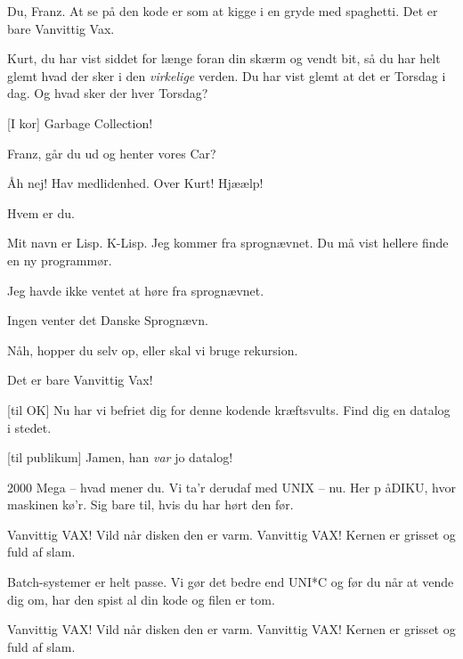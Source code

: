 \documentclass[a4paper,11pt]{article}
\begin{document}
\begin{sketch}

 Du, Franz. At se på den kode er som at kigge i en gryde med
spaghetti. Det er bare Vanvittig Vax.

 Kurt, du har vist siddet for længe foran din skærm og vendt bit, så du
har helt glemt hvad der sker i den \emph{virkelige} verden. Du har vist glemt at
det er Torsdag i dag. Og hvad sker der hver Torsdag?

[I kor] Garbage Collection!

 Franz, går du ud og henter vores Car?


 Åh nej! Hav medlidenhed. Over Kurt! Hjæælp!


 Hvem er du.

 Mit navn er Lisp. K-Lisp. Jeg kommer fra sprognævnet. Du må vist
hellere finde en ny programmør.

 Jeg havde ikke ventet at høre fra sprognævnet.

 Ingen venter det Danske Sprognævn.


 Nåh, hopper du selv op, eller skal vi bruge rekursion.


 Det er bare Vanvittig Vax!

[til OK] Nu har vi befriet dig for denne kodende kræftsvults. Find dig
en datalog i stedet.


[til publikum] Jamen, han \emph{var} jo datalog!

\end{sketch}


\begin{song}
2000 Mega -- hvad mener du.
Vi ta'r derudaf med UNIX -- nu.
Her p åDIKU, hvor maskinen kø'r.
Sig bare til, hvis du har hørt den før.

Vanvittig VAX!
Vild når disken den er varm.
Vanvittig VAX!
Kernen er grisset og fuld af slam.

Batch-systemer er helt passe.
Vi gør det bedre end UNI*C
og før du når at vende dig om,
har den spist al din kode og filen er tom.

Vanvittig VAX!
Vild når disken den er varm.
Vanvittig VAX!
Kernen er grisset og fuld af slam.
\end{song}
\end{document}
